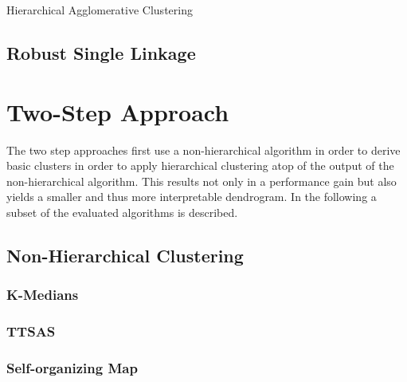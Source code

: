 \begin{algorithm}[h]
\caption{Hierarchical Agglomerative Clustering}\label{agglo}
\end{algorithm}

\subsection{Robust Single Linkage}\label{\positionnumber}



\section{Two-Step Approach}\label{\positionnumber}
The two step approaches first use a non-hierarchical algorithm in order to derive basic clusters in order to apply hierarchical clustering atop of the output of the non-hierarchical algorithm. This results not only in a performance gain but also yields a smaller and thus more interpretable dendrogram. In the following a subset of the evaluated algorithms is described. 
\subsection{Non-Hierarchical Clustering}
\subsubsection{K-Medians}\label{\positionnumber}
\subsubsection{TTSAS}\label{\positionnumber}
\subsubsection{Self-organizing Map}\label{\positionnumber}

